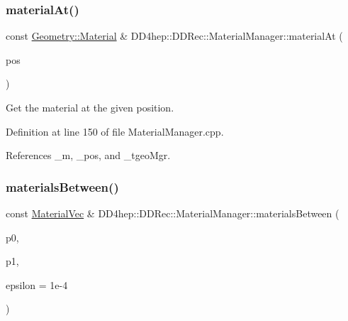 \hypertarget{class_d_d4hep_1_1_d_d_rec_1_1_material_manager_a230252814cc77e7d7e718783d376f41f}{}\label{class_d_d4hep_1_1_d_d_rec_1_1_material_manager_a230252814cc77e7d7e718783d376f41f} 
\subsubsection{\texorpdfstring{material\+At()}{materialAt()}}
{\footnotesize\ttfamily const \hyperlink{class_d_d4hep_1_1_geometry_1_1_material}{Geometry\+::\+Material} \& D\+D4hep\+::\+D\+D\+Rec\+::\+Material\+Manager\+::material\+At (\begin{DoxyParamCaption}\item[{const \hyperlink{class_d_d_surfaces_1_1_vector3_d}{D\+D\+Surfaces\+::\+Vector3D} \&}]{pos }\end{DoxyParamCaption})}

Get the material at the given position. 

Definition at line 150 of file Material\+Manager.\+cpp.



References \+\_\+m, \+\_\+pos, and \+\_\+tgeo\+Mgr.

\hypertarget{class_d_d4hep_1_1_d_d_rec_1_1_material_manager_a9e975753f152c9deb9c490e9222606c1}{}\label{class_d_d4hep_1_1_d_d_rec_1_1_material_manager_a9e975753f152c9deb9c490e9222606c1} 
\subsubsection{\texorpdfstring{materials\+Between()}{materialsBetween()}}
{\footnotesize\ttfamily const \hyperlink{namespace_d_d4hep_1_1_d_d_rec_a69fdab2f851316d2b9e50956920359f7}{Material\+Vec} \& D\+D4hep\+::\+D\+D\+Rec\+::\+Material\+Manager\+::materials\+Between (\begin{DoxyParamCaption}\item[{const \hyperlink{class_d_d_surfaces_1_1_vector3_d}{D\+D\+Surfaces\+::\+Vector3D} \&}]{p0,  }\item[{const \hyperlink{class_d_d_surfaces_1_1_vector3_d}{D\+D\+Surfaces\+::\+Vector3D} \&}]{p1,  }\item[{double}]{epsilon = {\ttfamily 1e-\/4} }\end{DoxyParamCaption})}

